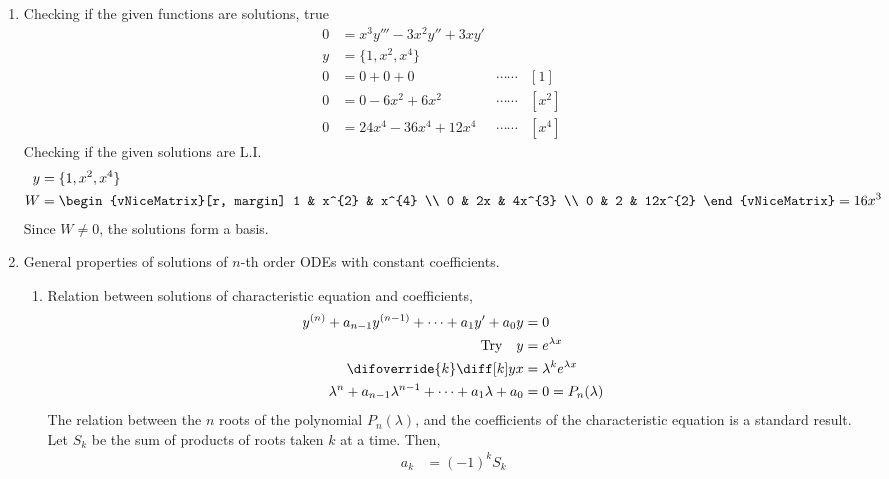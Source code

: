 \begin{enumerate}
    \item Checking if the given functions are solutions, true
          \begin{align}
              0 & = x^{3}y''' - 3x^{2}y'' + 3xy'                          \\
              y & = \{1, x^{2}, x^{4}\}                                   \\
              0 & = 0 + 0 + 0                    & \cdots\cdots & [1]     \\
              0 & = 0 - 6x^{2} + 6x^{2}          & \cdots\cdots & [x^{2}] \\
              0 & = 24x^{4} - 36x^{4} + 12x^{4}  & \cdots\cdots & [x^{4}]
          \end{align}
          Checking if the given solutions are L.I.
          \begin{align}
              y & = \{1, x^{2}, x^{4}\}           \\
              W & = \begin{vNiceMatrix}[r, margin]
                        1 & x^{2} & x^{4}   \\
                        0 & 2x    & 4x^{3}  \\
                        0 & 2     & 12x^{2}
                    \end{vNiceMatrix} = 16 x^{3}
          \end{align}
          Since $ W \neq 0 $, the solutions form a basis.

    \item General properties of solutions of $ n $-th order ODEs with constant
          coefficients.
          \begin{enumerate}
              \item Relation between solutions of characteristic equation and coefficients,
                    \begin{align}
                        y^{(n)} + a_{n-1}y^{(n-1)} + \dots + a_{1}y' + a_{0}y             & = 0                        \\
                        \text{Try} \quad y                                                & = e^{\lambda x}            \\
                        \difoverride{k} \diff[k] yx                                       & = \lambda^{k}e^{\lambda x} \\
                        \lambda^{n} + a_{n-1}\lambda^{n-1} + \dots + a_{1}\lambda + a_{0} & = 0 = P_{n}(\lambda)
                    \end{align}
                    The relation between the $ n $ roots of the polynomial $ P_{n}(\lambda) $,
                    and the coefficients of the characteristic equation is a standard result.
                    Let $ S_{k} $ be the sum of products of roots taken $ k $ at a time. Then,
                    \begin{align}
                        a_{k} & = (-1)^{k} S_{k}
                    \end{align}


\end{enumerate}
\end{enumerate}
